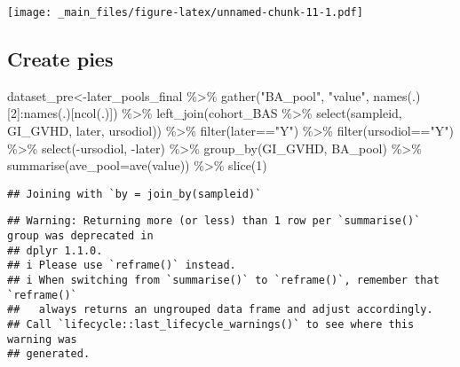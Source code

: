\documentclass[
]{book}
\newenvironment{Shaded}{\begin{snugshade}}{\end{snugshade}}
\newcommand{\AttributeTok}[1]{\textcolor[rgb]{0.77,0.63,0.00}{#1}}
\newcommand{\DecValTok}[1]{\textcolor[rgb]{0.00,0.00,0.81}{#1}}
\newcommand{\FunctionTok}[1]{\textcolor[rgb]{0.00,0.00,0.00}{#1}}
\newcommand{\NormalTok}[1]{#1}
\newcommand{\OtherTok}[1]{\textcolor[rgb]{0.56,0.35,0.01}{#1}}
\newcommand{\SpecialCharTok}[1]{\textcolor[rgb]{0.00,0.00,0.00}{#1}}
\newcommand{\StringTok}[1]{\textcolor[rgb]{0.31,0.60,0.02}{#1}}
\begin{document}
\texttt{[image: \_main\_files/figure-latex/unnamed-chunk-11-1.pdf]}

\hypertarget{create-pies}{%
\subsection{Create pies}\label{create-pies}}

\begin{Shaded}
\begin{Highlighting}[]
\NormalTok{dataset\_pre}\OtherTok{\textless{}{-}}\NormalTok{later\_pools\_final }\SpecialCharTok{\%\textgreater{}\%} 
  \FunctionTok{gather}\NormalTok{(}\StringTok{"BA\_pool"}\NormalTok{, }\StringTok{"value"}\NormalTok{, }\FunctionTok{names}\NormalTok{(.)[}\DecValTok{2}\NormalTok{]}\SpecialCharTok{:}\FunctionTok{names}\NormalTok{(.)[}\FunctionTok{ncol}\NormalTok{(.)]) }\SpecialCharTok{\%\textgreater{}\%} 
  \FunctionTok{left\_join}\NormalTok{(cohort\_BAS }\SpecialCharTok{\%\textgreater{}\%} 
              \FunctionTok{select}\NormalTok{(sampleid, GI\_GVHD, later, ursodiol)) }\SpecialCharTok{\%\textgreater{}\%} 
  \FunctionTok{filter}\NormalTok{(later}\SpecialCharTok{==}\StringTok{"Y"}\NormalTok{) }\SpecialCharTok{\%\textgreater{}\%} 
  \FunctionTok{filter}\NormalTok{(ursodiol}\SpecialCharTok{==}\StringTok{"Y"}\NormalTok{) }\SpecialCharTok{\%\textgreater{}\%} 
  \FunctionTok{select}\NormalTok{(}\SpecialCharTok{{-}}\NormalTok{ursodiol, }\SpecialCharTok{{-}}\NormalTok{later) }\SpecialCharTok{\%\textgreater{}\%} 
  \FunctionTok{group\_by}\NormalTok{(GI\_GVHD, BA\_pool) }\SpecialCharTok{\%\textgreater{}\%} 
  \FunctionTok{summarise}\NormalTok{(}\AttributeTok{ave\_pool=}\FunctionTok{ave}\NormalTok{(value)) }\SpecialCharTok{\%\textgreater{}\%} \FunctionTok{slice}\NormalTok{(}\DecValTok{1}\NormalTok{)}
\end{Highlighting}
\end{Shaded}

\begin{verbatim}
## Joining with `by = join_by(sampleid)`
\end{verbatim}

\begin{verbatim}
## Warning: Returning more (or less) than 1 row per `summarise()` group was deprecated in
## dplyr 1.1.0.
## i Please use `reframe()` instead.
## i When switching from `summarise()` to `reframe()`, remember that `reframe()`
##   always returns an ungrouped data frame and adjust accordingly.
## Call `lifecycle::last_lifecycle_warnings()` to see where this warning was
## generated.
\end{verbatim}
\end{document}
